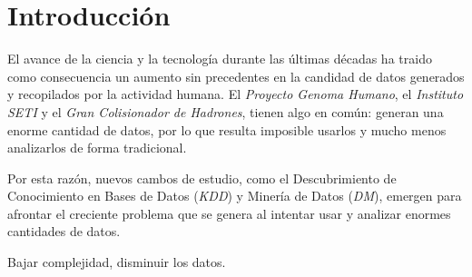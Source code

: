 \chapter*{Introducción}
\label{intro}

{\color{red}

El avance de la ciencia y la tecnología durante las últimas décadas ha traido como consecuencia un aumento sin precedentes en la candidad de datos generados y recopilados por la actividad humana. El \emph{Proyecto Genoma Humano}, el \emph{Instituto SETI} y el \emph{Gran Colisionador de Hadrones}, tienen algo en común: generan una enorme cantidad de datos, por lo que resulta imposible usarlos y mucho menos analizarlos de forma tradicional.

Por esta razón, nuevos cambos de estudio, como el Descubrimiento de Conocimiento en Bases de Datos (\emph{KDD}) y Minería de Datos (\emph{DM}), emergen para afrontar el creciente problema que se genera al intentar usar y analizar enormes cantidades de datos.

Bajar complejidad, disminuir los datos.

}
